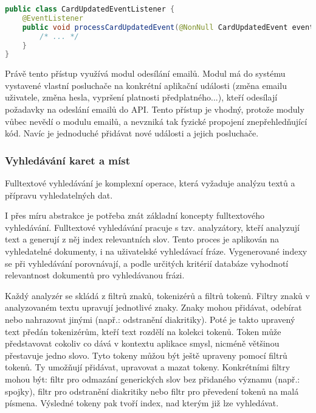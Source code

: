 		\begin{lstlisting}[language=Java, caption={Ukázka pozorovatele vystavených aplikačních událostí. Zdroj: [autor]}]
public class CardUpdatedEventListener {
    @EventListener
    public void processCardUpdatedEvent(@NonNull CardUpdatedEvent event) {
        /* ... */
    }
}
		\end{lstlisting}

		Právě tento přístup využívá modul odesílání emailů.
		Modul má do systému vystavené vlastní posluchače na konkrétní aplikační události (změna emailu uživatele, změna hesla,
		vypršení platnosti předplatného...), kteří odesílají požadavky na odeslání emailů do \ac{API}.
		Tento přístup je vhodný, protože moduly vůbec nevědí o modulu emailů, a nevzniká
		tak fyzické propojení znepřehledňující kód.
		Navíc je jednoduché přidávat nové události a jejich posluchače.

		\subsubsection{Vyhledávání karet a míst}

		Fulltextové vyhledávání je komplexní operace, která vyžaduje analýzu textů a přípravu vyhledatelných dat.

		I přes míru abstrakce je potřeba znát základní koncepty fulltextového vyhledávání.
		Fulltextové vyhledávání pracuje s tzv. analyzátory, kteří analyzují text a generují z něj index relevantních
		slov.
		Tento proces je aplikován na vyhledatelné dokumenty, i na uživatelské vyhledávací fráze.
		Vygenerované indexy se při vyhledávání porovnávají, a podle určitých kritérií databáze vyhodnotí relevantnost
		dokumentů pro vyhledávanou frázi. \cite{index_search_analysis}

		Každý analyzér se skládá z filtrů znaků, tokenizérů a filtrů tokenů.
		Filtry znaků v analyzovaném textu upravují jednotlivé znaky.
		Znaky mohou přidávat, odebírat nebo nahrazovat jinými (např.: odstranění diakritiky).
		Poté je takto upravený text předán tokenizérům, kteří text rozdělí na kolekci tokenů.
		Token může představovat cokoliv co dává v kontextu aplikace smysl, nicméně většinou přestavuje jedno
		slovo.
		Tyto tokeny můžou být ještě upraveny pomocí filtrů tokenů.
		Ty umožňují přidávat, upravovat a mazat tokeny.
		Konkrétními filtry mohou být: filtr pro odmazání generických slov bez přidaného významu (např.: spojky), filtr pro odstranění
		diakritiky nebo filtr pro převedení tokenů na malá písmena.
		Výsledné tokeny pak tvoří index, nad kterým již lze vyhledávat.
		\cite{analyzer_anatomy}

